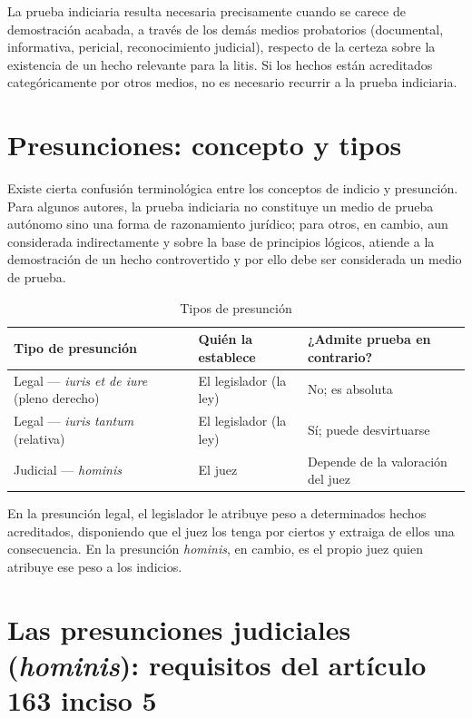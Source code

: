 \documentclass[12pt,oneside]{book}
\begin{document}
La prueba indiciaria resulta necesaria precisamente cuando se carece de demostración acabada, a través de los demás medios probatorios (documental, informativa, pericial, reconocimiento judicial), respecto de la certeza sobre la existencia de un hecho relevante para la litis. Si los hechos están acreditados categóricamente por otros medios, no es necesario recurrir a la prueba indiciaria.

\section{Presunciones: concepto y tipos}

Existe cierta confusión terminológica entre los conceptos de indicio y presunción. Para algunos autores, la prueba indiciaria no constituye un medio de prueba autónomo sino una forma de razonamiento jurídico; para otros, en cambio, aun considerada indirectamente y sobre la base de principios lógicos, atiende a la demostración de un hecho controvertido y por ello debe ser considerada un medio de prueba.

\begin{table}[H]
\centering
\begin{tabularx}{\textwidth}{>{\raggedright\arraybackslash}p{} >{\raggedright\arraybackslash}p{} X}
\toprule
\textbf{Tipo de presunción} & \textbf{Quién la establece} & \textbf{¿Admite prueba en contrario?} \\
\midrule
Legal --- \textit{iuris et de iure} (pleno derecho) & El legislador (la ley) & No; es absoluta \\
Legal --- \textit{iuris tantum} (relativa) & El legislador (la ley) & Sí; puede desvirtuarse \\
Judicial --- \textit{hominis} & El juez & Depende de la valoración del juez \\
\bottomrule
\end{tabularx}
\caption{Tipos de presunción}
\end{table}

En la presunción legal, el legislador le atribuye peso a determinados hechos acreditados, disponiendo que el juez los tenga por ciertos y extraiga de ellos una consecuencia. En la presunción \textit{hominis}, en cambio, es el propio juez quien atribuye ese peso a los indicios.

\section{Las presunciones judiciales (\textit{hominis}): requisitos del artículo 163 inciso 5}
\end{document}

